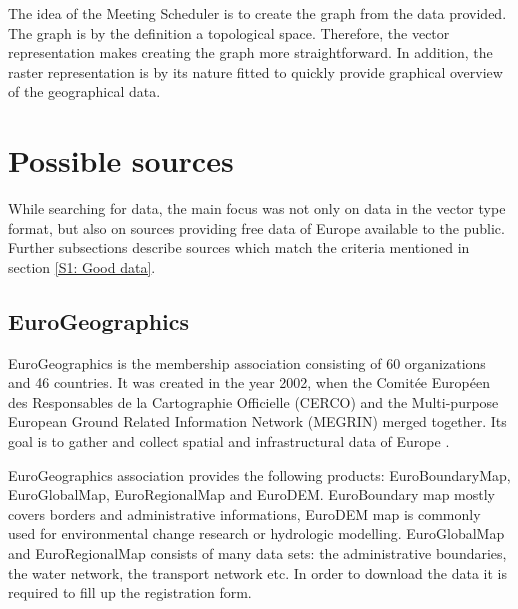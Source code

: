 \documentclass[thesis=M,english]{FITthesis}[2012/10/20]
\begin{document}

The idea of the Meeting Scheduler is to create the graph from the data provided. The graph is by the definition a topological space. Therefore, the vector representation makes creating the graph more straightforward. In addition, the raster representation is by its nature fitted to quickly provide graphical overview of the geographical data.

\section{Possible sources}
\label{sec:posSources}

While searching for data, the main focus was not only on data in the vector type format, but also on sources providing free data of Europe available to the public. Further subsections describe sources which match the criteria mentioned in section \ref{S1: Good data}.

 
\subsection{EuroGeographics}
EuroGeographics is the membership association consisting of 60 organizations and 46 countries. It was created in the year 2002, when the Comit{\' e}e Europ{\' e}en des Responsables de la Cartographie Officielle (CERCO) and the Multi-purpose European Ground Related Information Network (MEGRIN) merged together. Its goal is to gather and collect spatial and infrastructural data of Europe \cite{Euro16}. 

EuroGeographics association provides the following products: EuroBoundaryMap, EuroGlobalMap, EuroRegionalMap and EuroDEM.
EuroBoundary map mostly covers borders and administrative informations, EuroDEM map is commonly used for environmental change research or hydrologic modelling.
EuroGlobalMap and EuroRegionalMap consists of many data sets: the administrative boundaries, the water network, the transport network etc. 
In order to download the data it is required to fill up the registration form.
\end{document}
